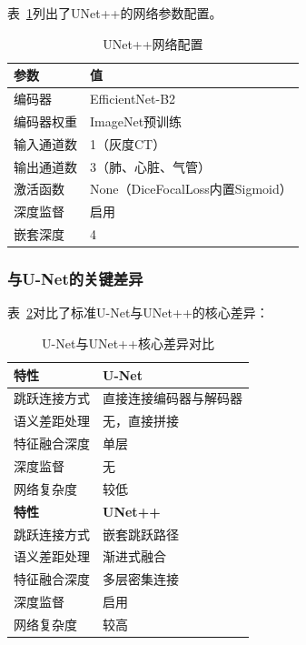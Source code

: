 \documentclass[12pt, a4paper]{article}
\begin{document}
表~\ref{tab:unetpp_params}列出了UNet++的网络参数配置。

\begin{table}[H]
    \centering
    \caption{UNet++网络配置}
    \label{tab:unetpp_params}
    \begin{tabular}{@{}ll@{}}
        \toprule
        \textbf{参数} & \textbf{值} \\
        \midrule
        编码器 & EfficientNet-B2 \\
        编码器权重 & ImageNet预训练 \\
        输入通道数 & 1（灰度CT） \\
        输出通道数 & 3（肺、心脏、气管） \\
        激活函数 & None（DiceFocalLoss内置Sigmoid） \\
        深度监督 & 启用 \\
        嵌套深度 & 4 \\
        \bottomrule
    \end{tabular}
\end{table}

\subsubsection{与U-Net的关键差异}

表~\ref{tab:unet_vs_unetpp}对比了标准U-Net与UNet++的核心差异：

\begin{table}[H]
    \centering
    \caption{U-Net与UNet++核心差异对比}
    \label{tab:unet_vs_unetpp}
    \begin{tabular}{@{}ll@{}}
        \toprule
        \textbf{特性} & \textbf{U-Net} \\
        \midrule
        跳跃连接方式 & 直接连接编码器与解码器 \\
        语义差距处理 & 无，直接拼接 \\
        特征融合深度 & 单层 \\
        深度监督 & 无 \\
        网络复杂度 & 较低 \\
        \midrule
        \textbf{特性} & \textbf{UNet++} \\
        \midrule
        跳跃连接方式 & 嵌套跳跃路径 \\
        语义差距处理 & 渐进式融合 \\
        特征融合深度 & 多层密集连接 \\
        深度监督 & 启用 \\
        网络复杂度 & 较高 \\
        \bottomrule
    \end{tabular}
\end{table}
\end{document}
